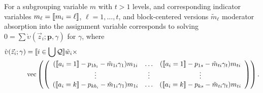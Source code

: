 \documentclass{article}
\DeclarePairedDelimiter{\indicator}{\llbracket}{\rrbracket}
\newcommand{\owt}[1][{[a_i]}]{\ensuremath{\check{w}_{i#1}}}
\newcommand{\absorbModeratorEF}{\grave{\upsilon}}
\begin{document}
For a subgrouping variable $m$ with $t>1$ levels, and corresponding
indicator variables $m_{\ell} =\indicator{m_{i}=\ell}$, $\ell=1,
\ldots, t$, and block-centered versions $\tilde{m}_{\ell}$  moderator absorption into the assignment variable
corresponds to solving $0 = \sum
\absorbModeratorEF(\vec{z}_{i}; \mathbf{p}, {\gamma})$ for $\gamma$, where
\begin{align}
    \absorbModeratorEF(\vec{z}_{i}; \mathbf{\gamma})
&=
                                                 \indicator{i \in \bigcup \mathcal{Q}} \owt[] \times \nonumber \\
  &\operatorname{vec}  \left(%
                                                 \left(
                                                 \begin{array}{ccc}
                                                   (\indicator{a_{i}=1}-p_{1b_{i}}-\tilde{m}_{1i}\gamma_{1})m_{1i}&\ldots&(\indicator{a_{i}=1}-p_{1s}-\tilde{m}_{ti}\gamma_{t})m_{ti}
                                                   \\
                                                   \vdots & \vdots &
                                                                     \vdots
                                                   \\
                                                   (\indicator{a_{i}=k}-p_{kb_{i}}
                                                   - \tilde{m}_{1i}\gamma_{1})m_{1i}&\ldots&(\indicator{a_{i}=k}-p_{ks}-\tilde{m}_{ti}\gamma_{t})m_{ti}\\                                                 \end{array}
  \right)%
  \right) .  \label{eq:17}
\end{align}
\end{document}
